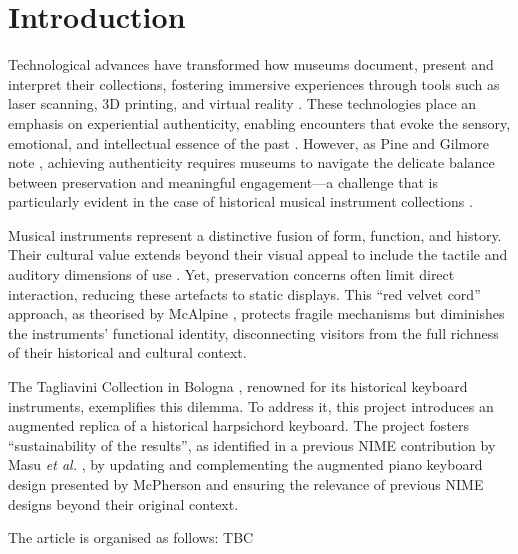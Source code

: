 \section{Introduction}\label{introduction}

Technological advances have transformed how museums document, present and interpret their collections, fostering immersive experiences through tools such as laser scanning, 3D printing, and virtual reality \cite{allard2005use,Wachowiak01082009,RCM_2024_3D,Kuzminsky_LaserScan_2012,Schaich_3D_2007}. These technologies place an emphasis on experiential authenticity, enabling encounters that evoke the sensory, emotional, and intellectual essence of the past \cite{trant_Auth_1999}. However, as Pine and Gilmore note \cite{pinegilmore_2007}, achieving authenticity requires museums to navigate the delicate balance between preservation and meaningful engagement—a challenge that is particularly evident in the case of historical musical instrument collections \cite{McAlpine2014}.

Musical instruments represent a distinctive fusion of form, function, and history. Their cultural value extends beyond their visual appeal to include the tactile and auditory dimensions of use \cite{Fritz2017}. Yet, preservation concerns often limit direct interaction, reducing these artefacts to static displays. This ``red velvet cord'' approach, as theorised by McAlpine \cite{McAlpine2014}, protects fragile mechanisms but diminishes the instruments’ functional identity, disconnecting visitors from the full richness of their historical and cultural context.

The Tagliavini Collection in Bologna \cite{Tagliavini2007}, renowned for its historical keyboard instruments, exemplifies this dilemma. To address it, this project introduces an augmented replica of a historical harpsichord keyboard. 
The project fosters ``sustainability of the results'', as identified in a previous NIME contribution by Masu \emph{et al.}  \cite{Masu_NIME_2023}, by updating and complementing the augmented piano keyboard design presented by McPherson \cite{McPherson2013} and ensuring the relevance of previous NIME designs beyond their original context. 


The article is organised as follows: TBC




